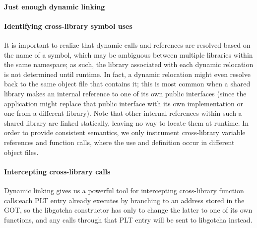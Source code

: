 \paragraph{Just enough dynamic linking}


\paragraph{Identifying cross-library symbol uses}

It is important to realize that dynamic calls and references are resolved based on
the name of a symbol, which may be ambiguous between multiple libraries within the
same namespace; as such, the library associated with each dynamic relocation is not
determined until runtime.  In fact, a dynamic relocation might even resolve back to
the same object file that contains it; this is most common when a shared library
makes an internal reference to one of its own public interfaces (since the
application might replace that public interface with its own implementation or one
from a different library).  Note that other internal references within such a shared
library are linked statically, leaving no way to locate them at runtime.  In order to
provide consistent semantics, we only instrument cross-library variable
references and function calls, where the use and definition occur in different object
files.


\paragraph{Intercepting cross-library calls}

Dynamic linking gives us a powerful tool for intercepting cross-library function
calls:\@ each PLT entry already executes by branching to an address stored in the
GOT, so the libgotcha constructor has only to change the latter to one of its own
functions, and any calls through that PLT entry will be sent to libgotcha instead.

